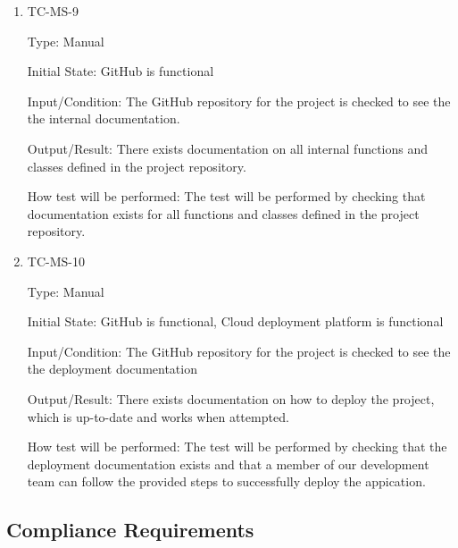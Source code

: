 \documentclass[12pt, titlepage]{article}
\begin{document}
\begin{enumerate}
  \item{TC-MS-9\\}

    Type: Manual

    Initial State: GitHub is functional

    Input/Condition: The GitHub repository for the project is checked
    to see the the internal documentation.

    Output/Result: There exists documentation on all internal
    functions and classes defined in the project repository.

    How test will be performed: The test will be performed by
    checking that documentation exists for all functions and classes
    defined in the project repository.

  \item{TC-MS-10\\}

    Type: Manual

    Initial State: GitHub is functional, Cloud deployment platform is functional

    Input/Condition: The GitHub repository for the project is checked
    to see the the deployment documentation

    Output/Result: There exists documentation on how to deploy the
    project, which is up-to-date and works when attempted.

    How test will be performed: The test will be performed by
    checking that the deployment documentation exists and that a
    member of our development team can follow the provided steps to
    successfully deploy the appication.

\end{enumerate}

\subsection{Compliance Requirements}
\end{document}
